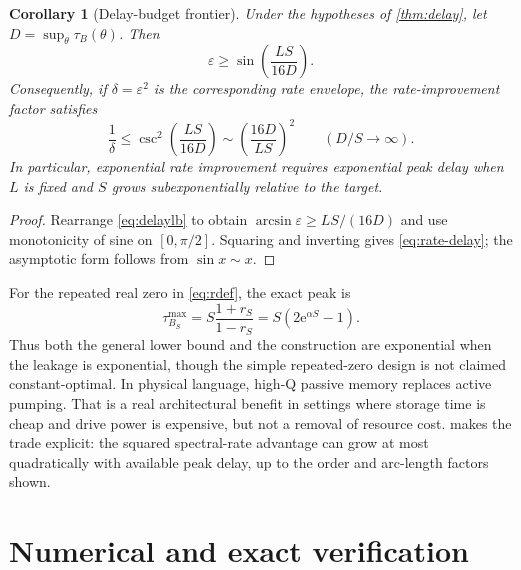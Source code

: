 \documentclass[11pt]{article}
\newtheorem{corollary}[theorem]{Corollary}
\theoremstyle{definition}
\theoremstyle{remark}
\newcommand{\e}{\mathrm{e}}
\begin{document}
\begin{corollary}[Delay-budget frontier]\label{cor:delayfrontier}
Under the hypotheses of \cref{thm:delay}, let
$D=\sup_\theta\tau_B(\theta)$.  Then
\begin{equation}\label{eq:frontier}
 \varepsilon\geq\sin\!\left(\frac{LS}{16D}\right).
\end{equation}
Consequently, if $\delta=\varepsilon^2$ is the corresponding rate envelope,
the rate-improvement factor satisfies
\begin{equation}\label{eq:rate-delay}
 \frac1\delta\leq
 \csc^2\!\left(\frac{LS}{16D}\right)
 \sim\left(\frac{16D}{LS}\right)^2
 \qquad(D/S\to\infty).
\end{equation}
In particular, exponential rate improvement requires exponential peak delay
when $L$ is fixed and $S$ grows subexponentially relative to the target.
\end{corollary}

\begin{proof}
Rearrange \eqref{eq:delaylb} to obtain
$\arcsin\varepsilon\geq LS/(16D)$ and use monotonicity of sine on
$[0,\pi/2]$.  Squaring and inverting gives \eqref{eq:rate-delay}; the
asymptotic form follows from $\sin x\sim x$.
\end{proof}

For the repeated real zero in \eqref{eq:rdef}, the exact peak is
\begin{equation}\label{eq:ourdelay}
 \tau_{B_S}^{\max}=S\frac{1+r_S}{1-r_S}
 =S(2\e^{\alpha S}-1).
\end{equation}
Thus both the general lower bound and the construction are exponential when
the leakage is exponential, though the simple repeated-zero design is not
claimed constant-optimal.  In physical language, high-Q passive memory
replaces active pumping.  That is a real architectural benefit in settings
where storage time is cheap and drive power is expensive, but not a removal
of resource cost.   makes the trade explicit: the
squared spectral-rate advantage can grow at most quadratically with available
peak delay, up to the order and arc-length factors shown.

\section{Numerical and exact verification}
\end{document}
